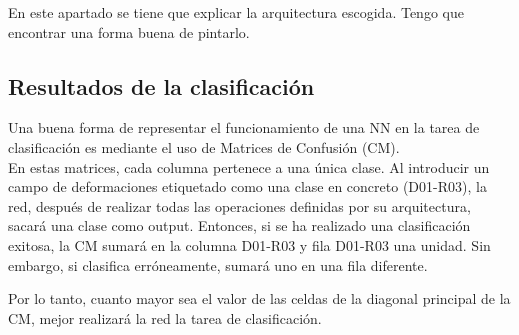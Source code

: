 En este apartado se tiene que explicar la arquitectura escogida. Tengo que encontrar una forma buena de pintarlo.


\subsection{Resultados de la clasificación}

Una buena forma de representar el funcionamiento de una NN en la tarea de clasificación es mediante el uso de Matrices de Confusión (CM).\\

En estas matrices, cada columna pertenece a una única clase. Al introducir un campo de deformaciones etiquetado como una clase en concreto (D01-R03), la red, después de realizar todas las operaciones definidas por su arquitectura, sacará una clase como output. Entonces, si se ha realizado una clasificación exitosa, la CM sumará en la columna D01-R03 y fila D01-R03 una unidad. Sin embargo, si clasifica erróneamente, sumará uno en una fila diferente. 

Por lo tanto, cuanto mayor sea el valor de las celdas de la diagonal principal de la CM, mejor realizará la red la tarea de clasificación.


